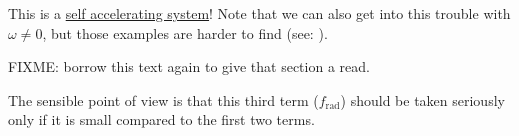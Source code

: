 This is a \underline{self accelerating system}!  Note that we can also get into this trouble with $\omega \ne 0$, but those examples are harder to find (see: \citep{griffith1981introduction}).

FIXME: borrow this text again to give that section a read.

The sensible point of view is that this third term ($f_{\text{rad}}$) should be taken seriously only if it is small compared to the first two terms.

%

\EndArticle
